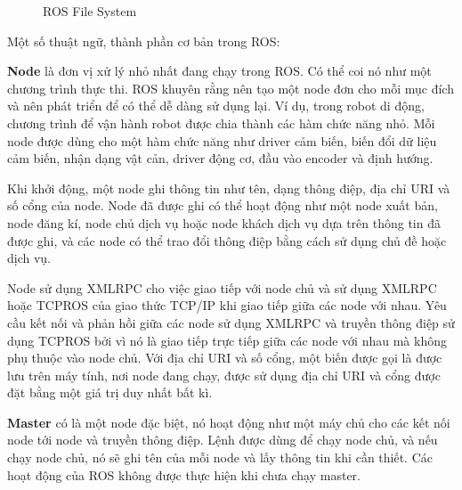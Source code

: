 {\begin{figure}[htbp]
  \caption{ROS File System}
  \label{fig:ros-filesystem}
\end{figure}

Một số thuật ngữ, thành phần cơ bản trong ROS:

\textbf{Node} là đơn vị xử lý nhỏ nhất đang chạy trong ROS. Có thể coi nó như một chương trình thực thi. ROS khuyên rằng nên tạo một node đơn cho mỗi mục đích và nên phát triển để có thể dễ dàng sử dụng lại. Ví dụ, trong robot di động, chương trình để vận hành robot được chia thành các hàm chức năng nhỏ. Mỗi node được dùng cho một hàm chức năng như driver cảm biến, biến đổi dữ liệu cảm biến, nhận dạng vật cản, driver động cơ, đầu vào encoder và định hướng.

Khi khởi động, một node ghi thông tin như tên, dạng thông điệp, địa chỉ URI và số cổng của node. Node đã được ghi có thể hoạt động như một node xuất bản, node đăng kí, node chủ dịch vụ hoặc node khách dịch vụ dựa trên thông tin đã được ghi, và các node có thể trao đổi thông điệp bằng cách sử dụng chủ đề hoặc dịch vụ.

Node sử dụng XMLRPC cho việc giao tiếp với node chủ và sử dụng XMLRPC hoặc TCPROS của giao thức TCP/IP khi giao tiếp giữa các node với nhau. Yêu cầu kết nối và phản hồi giữa các node sử dụng XMLRPC và truyền thông điệp sử dụng TCPROS bởi vì nó là giao tiếp trực tiếp giữa các node với nhau mà không phụ thuộc vào node chủ. Với địa chỉ URI và số cổng, một biến được gọi là  được lưu trên máy tính, nơi node đang chạy, được sử dụng địa chỉ URI và cổng được đặt bằng một giá trị duy nhất bất kì.

\textbf{Master} có là một node đặc biệt, nó hoạt động như một máy chủ cho các kết nối node tới node và truyền thông điệp. Lệnh  được dùng để chạy node chủ, và nếu chạy node chủ, nó sẽ ghi tên của mỗi node và lấy thông tin khi cần thiết. Các hoạt động của ROS không được thực hiện khi chưa chạy master.

}
